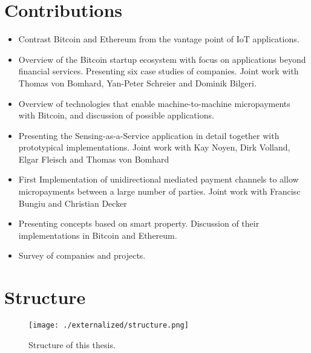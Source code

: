\newpage
\section{Contributions}

\begin{itemize}
\item{Contrast Bitcoin and Ethereum from the vantage point of IoT applications.}
\item{Overview of the Bitcoin startup ecosystem with focus on applications beyond financial services. Presenting six case studies of companies. Joint work with Thomas von Bomhard, Yan-Peter Schreier and Dominik Bilgeri.}
\item{Overview of technologies that enable machine-to-machine micropayments with Bitcoin, and discussion of possible applications.}
\item{Presenting the Sensing-as-a-Service application in detail together with prototypical implementations. Joint work with Kay Noyen, Dirk Volland, Elgar Fleisch and Thomas von Bomhard}
\item{First Implementation of unidirectional mediated payment channels to allow micropayments between a large number of parties. Joint work with Francisc Bungiu and Christian Decker}
\item{Presenting concepts based on smart property. Discussion of their implementations in Bitcoin and Ethereum.}
\item{Survey of companies and projects.}
\end{itemize}

\newpage
\section{Structure}

\begin{figure}
\centering
\texttt{[image: ./externalized/structure.png]}
\caption{Structure of this thesis.}
\label{fig:structure}
\end{figure}
